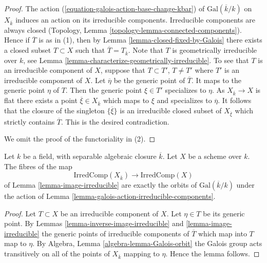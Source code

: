 \begin{proof}
The action (\ref{equation-galois-action-base-change-kbar})
of $\text{Gal}(\overline{k}/k)$ on $X_{\overline{k}}$
induces an action on its irreducible components.
Irreducible components are always closed
(Topology, Lemma \ref{topology-lemma-connected-components}).
Hence if $\overline{T}$ is as in (1), then by
Lemma \ref{lemma-closed-fixed-by-Galois} there exists a closed
subset $T \subset X$ such that $\overline{T} = T_{\overline{k}}$.
Note that $T$ is geometrically irreducible over $k$, see
Lemma \ref{lemma-characterize-geometrically-irreducible}.
To see that $T$ is an irreducible component of $X$, suppose that
$T \subset T'$, $T \not = T'$ where $T'$ is an irreducible
component of $X$. Let $\overline{\eta}$ be the generic point of
$\overline{T}$. It maps to the generic point $\eta$ of $T$.
Then the generic point $\xi \in T'$ specializes to $\eta$.
As $X_{\overline{k}} \to X$ is flat there exists a point
$\overline{\xi} \in X_{\overline{k}}$ which maps to $\xi$ and
specializes to $\overline{\eta}$. It follows that
the closure of the singleton $\{\overline{\xi}\}$ is an
irreducible closed subset of $X_{\overline{\xi}}$ which
strictly contains $\overline{T}$. This is the desired contradiction.

\medskip\noindent
We omit the proof of the functoriality in (2).
\end{proof}

\begin{lemma}
\label{lemma-orbit-irreducible-components}
Let $k$ be a field, with separable algebraic closure $\overline{k}$.
Let $X$ be a scheme over $k$.
The fibres of the map
$$
\text{IrredComp}(X_{\overline{k}})
\longrightarrow
\text{IrredComp}(X)
$$
of
Lemma \ref{lemma-image-irreducible}
are exactly the orbits of $\text{Gal}(\overline{k}/k)$ under the action of
Lemma \ref{lemma-galois-action-irreducible-components}.
\end{lemma}

\begin{proof}
Let $T \subset X$ be an irreducible component of $X$.
Let $\eta \in T$ be its generic point. By
Lemmas \ref{lemma-inverse-image-irreducible} and
\ref{lemma-image-irreducible}
the generic points of irreducible components of $\overline{T}$
which map into $T$ map to $\eta$. By
Algebra, Lemma \ref{algebra-lemma-Galois-orbit}
the Galois group acts transitively on
all of the points of $X_{\overline{k}}$ mapping to $\eta$.
Hence the lemma follows.
\end{proof}

